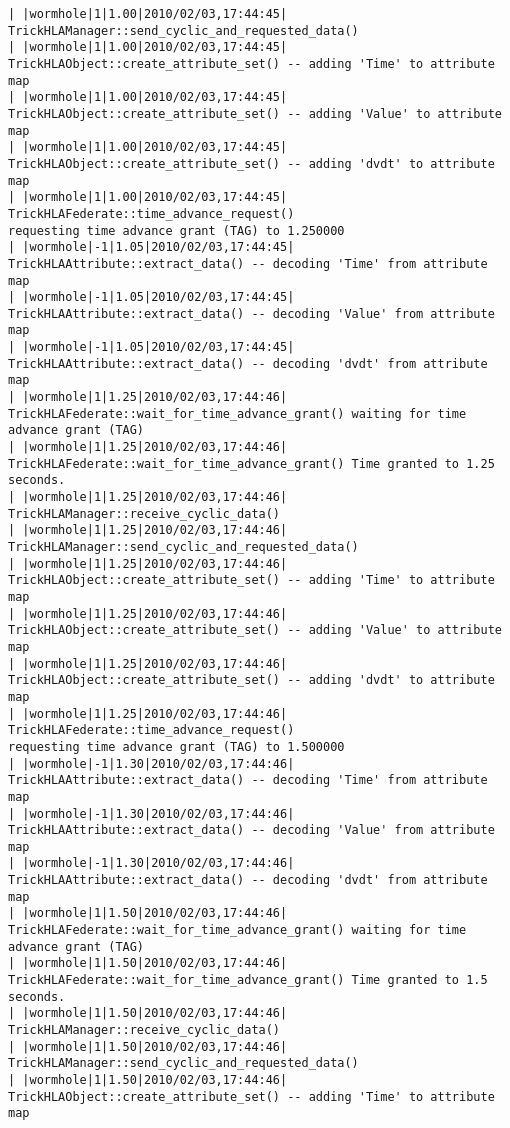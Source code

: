 \begin{lstlisting}[numbers=none,caption={output showing conditionally sent cyclic data}]
| |wormhole|1|1.00|2010/02/03,17:44:45| TrickHLAManager::send_cyclic_and_requested_data()
| |wormhole|1|1.00|2010/02/03,17:44:45| TrickHLAObject::create_attribute_set() -- adding 'Time' to attribute map
| |wormhole|1|1.00|2010/02/03,17:44:45| TrickHLAObject::create_attribute_set() -- adding 'Value' to attribute map
| |wormhole|1|1.00|2010/02/03,17:44:45| TrickHLAObject::create_attribute_set() -- adding 'dvdt' to attribute map
| |wormhole|1|1.00|2010/02/03,17:44:45| TrickHLAFederate::time_advance_request()   
requesting time advance grant (TAG) to 1.250000
| |wormhole|-1|1.05|2010/02/03,17:44:45| TrickHLAAttribute::extract_data() -- decoding 'Time' from attribute map
| |wormhole|-1|1.05|2010/02/03,17:44:45| TrickHLAAttribute::extract_data() -- decoding 'Value' from attribute map
| |wormhole|-1|1.05|2010/02/03,17:44:45| TrickHLAAttribute::extract_data() -- decoding 'dvdt' from attribute map
| |wormhole|1|1.25|2010/02/03,17:44:46| TrickHLAFederate::wait_for_time_advance_grant() waiting for time advance grant (TAG)
| |wormhole|1|1.25|2010/02/03,17:44:46| TrickHLAFederate::wait_for_time_advance_grant() Time granted to 1.25 seconds.
| |wormhole|1|1.25|2010/02/03,17:44:46| TrickHLAManager::receive_cyclic_data()
| |wormhole|1|1.25|2010/02/03,17:44:46| TrickHLAManager::send_cyclic_and_requested_data()
| |wormhole|1|1.25|2010/02/03,17:44:46| TrickHLAObject::create_attribute_set() -- adding 'Time' to attribute map
| |wormhole|1|1.25|2010/02/03,17:44:46| TrickHLAObject::create_attribute_set() -- adding 'Value' to attribute map
| |wormhole|1|1.25|2010/02/03,17:44:46| TrickHLAObject::create_attribute_set() -- adding 'dvdt' to attribute map
| |wormhole|1|1.25|2010/02/03,17:44:46| TrickHLAFederate::time_advance_request()   
requesting time advance grant (TAG) to 1.500000
| |wormhole|-1|1.30|2010/02/03,17:44:46| TrickHLAAttribute::extract_data() -- decoding 'Time' from attribute map
| |wormhole|-1|1.30|2010/02/03,17:44:46| TrickHLAAttribute::extract_data() -- decoding 'Value' from attribute map
| |wormhole|-1|1.30|2010/02/03,17:44:46| TrickHLAAttribute::extract_data() -- decoding 'dvdt' from attribute map
| |wormhole|1|1.50|2010/02/03,17:44:46| TrickHLAFederate::wait_for_time_advance_grant() waiting for time advance grant (TAG)
| |wormhole|1|1.50|2010/02/03,17:44:46| TrickHLAFederate::wait_for_time_advance_grant() Time granted to 1.5 seconds.
| |wormhole|1|1.50|2010/02/03,17:44:46| TrickHLAManager::receive_cyclic_data()
| |wormhole|1|1.50|2010/02/03,17:44:46| TrickHLAManager::send_cyclic_and_requested_data()
| |wormhole|1|1.50|2010/02/03,17:44:46| TrickHLAObject::create_attribute_set() -- adding 'Time' to attribute map

\end{lstlisting}

